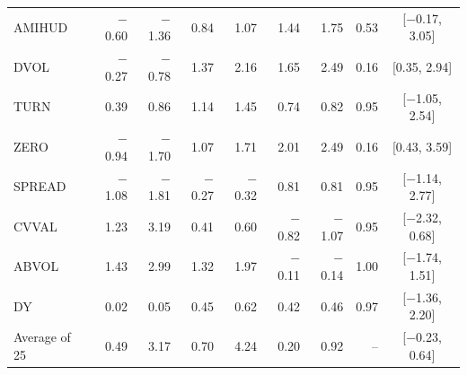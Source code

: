 \begin{tabular}{l rr rr rrrc}
AMIHUD & $-$0.60 & $-$1.36 & 0.84 & 1.07 & 1.44 & 1.75 & 0.53 & [$-$0.17, 3.05] \\
DVOL & $-$0.27 & $-$0.78 & 1.37 & 2.16 & 1.65 & 2.49 & 0.16 & [0.35, 2.94] \\
TURN & 0.39 & 0.86 & 1.14 & 1.45 & 0.74 & 0.82 & 0.95 & [$-$1.05, 2.54] \\
ZERO & $-$0.94 & $-$1.70 & 1.07 & 1.71 & 2.01 & 2.49 & 0.16 & [0.43, 3.59] \\
SPREAD & $-$1.08 & $-$1.81 & $-$0.27 & $-$0.32 & 0.81 & 0.81 & 0.95 & [$-$1.14, 2.77] \\
CVVAL & 1.23 & 3.19 & 0.41 & 0.60 & $-$0.82 & $-$1.07 & 0.95 & [$-$2.32, 0.68] \\
ABVOL & 1.43 & 2.99 & 1.32 & 1.97 & $-$0.11 & $-$0.14 & 1.00 & [$-$1.74, 1.51] \\
\addlinespace[2pt]
DY & 0.02 & 0.05 & 0.45 & 0.62 & 0.42 & 0.46 & 0.97 & [$-$1.36, 2.20] \\
\midrule Average of 25 & 0.49 & 3.17 & 0.70 & 4.24 & 0.20 & 0.92 & -- & [$-$0.23, 0.64] \\
\bottomrule
\end{tabular}